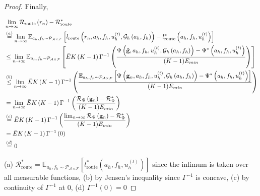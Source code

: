 \documentclass{article} %
\begin{document}
\begin{proof}
Finally,

\begin{align*}
    &\lim_{n \to \infty }\mathcal{R}_{\text{route}}\left(r_n\right) - \mathcal{R}_{\text{route}}^* \\
    &\overset{(a)}{=} \lim_{n \to \infty } \mathbb{E}_{a_h, f_h \sim \mathcal{P}_{\mathcal{A} \times \mathcal{F}}}\left[l_{\text{route}}\left(r_n, a_h, f_h, u^{(t)}_h, \mathcal{G}_h\left(a_h, f_h\right)\right) - l_{\text{route}}^*\left(a_h, f_h, u^{(t)}_h\right)\right] \\
    &\leq \lim_{n \to \infty } \mathbb{E}_{a_h, f_h \sim \mathcal{P}_{\mathcal{A} \times \mathcal{F}}}\left[\Bar{E}K\left(K- 1\right)\Gamma^{-1}\left(\frac{\Psi\left(\tilde{\mathbf{g}}, a_h, f_h, u^{(t)}_h, \mathcal{G}_h\left(a_h, f_h\right)\right)- \Psi^*\left(a_h, f_h, u^{(t)}_h\right)}{(K - 1)E_{min}} \right)\right] \\
    &\overset{(b)}{\leq} \lim_{n \to \infty } \Bar{E}K\left(K- 1\right)\Gamma^{-1}\left(\frac{\mathbb{E}_{a_h, f_h \sim \mathcal{P}_{\mathcal{A} \times \mathcal{F}}}\left[\Psi\left(\mathbf{g}_n, a_h, f_h, u^{(t)}_h, \mathcal{G}_h\left(a_h, f_h\right)\right)- \Psi^*\left(a_h, f_h, u^{(t)}_h\right) \right]}{(K - 1)E_{min}}\right) \\
    &= \lim_{n \to \infty } \Bar{E}K\left(K- 1\right)\Gamma^{-1}\left(\frac{\mathcal{R}_{\Psi}\left(\mathbf{g}_n\right) - \mathcal{R}_{\Psi}^*}{(K - 1)E_{min}}\right) \\
    &\overset{(c)}{=} \Bar{E}K\left(K- 1\right)\Gamma^{-1}\left(\frac{\lim_{n \to \infty } \mathcal{R}_{\Psi}\left(\mathbf{g}_n\right) - \mathcal{R}_{\Psi}^*}{(K - 1)E_{min}}\right) \\
    &= \Bar{E}K\left(K- 1\right)\Gamma^{-1}\left(0\right) \\
    &\overset{(d)}{=} 0
\end{align*}

(a) $\mathcal{R}_{\text{route}}^*  = \mathbb{E}_{a_h, f_h \sim \mathcal{P}_{\mathcal{A} \times \mathcal{F}}}\left[l_{\text{route}}^*\left(a_h, f_h, u^{(t)}_h\right)\right]$ since the infimum is taken over all measurable functions, (b) by Jensen's inequality since $\Gamma^{-1}$ is concave, (c) by continuity of $\Gamma^{-1}$ at $0$, (d) $\Gamma^{-1}(0) = 0$



\end{proof}
\end{document}
